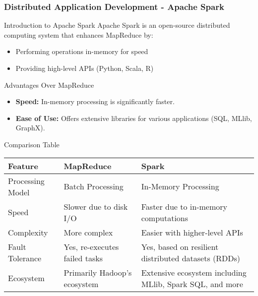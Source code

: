\documentclass[aspectratio=169]{beamer}
\begin{document}
\begin{frame}[fragile]
    \frametitle{Distributed Application Development - Apache Spark}
    \begin{block}{Introduction to Apache Spark}
        Apache Spark is an open-source distributed computing system that enhances MapReduce by:
        \begin{itemize}
            \item Performing operations in-memory for speed
            \item Providing high-level APIs (Python, Scala, R)
        \end{itemize}
    \end{block}

    \begin{block}{Advantages Over MapReduce}
        \begin{itemize}
            \item \textbf{Speed:} In-memory processing is significantly faster.
            \item \textbf{Ease of Use:} Offers extensive libraries for various applications (SQL, MLlib, GraphX).
        \end{itemize}
    \end{block}

    \begin{block}{Comparison Table}
        \begin{tabular}{|l|l|l|}
            \hline
            Feature                & MapReduce                          & Spark                          \\
            \hline
            Processing Model       & Batch Processing                   & In-Memory Processing           \\
            Speed                  & Slower due to disk I/O            & Faster due to in-memory computations \\
            Complexity             & More complex                       & Easier with higher-level APIs  \\
            Fault Tolerance        & Yes, re-executes failed tasks      & Yes, based on resilient distributed datasets (RDDs) \\
            Ecosystem              & Primarily Hadoop's ecosystem       & Extensive ecosystem including MLlib, Spark SQL, and more \\
            \hline
        \end{tabular}
    \end{block}
\end{frame}
\end{document}

